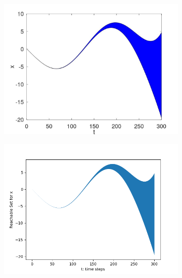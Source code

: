 \documentclass[EPiC]{easychair}
\begin{document}
\begin{figure}[h]
    \begin{subfigure}{0.47\textwidth}
    \centering
    \includegraphics[width=\textwidth]{SapoFigures/Rosslert/SapoRossler_X.jpg}
    \end{subfigure}
    \begin{subfigure}{0.47\textwidth}
    \centering
    \includegraphics[width=1.3\textwidth]{SapoFigures/Rosslert/KaaRosslerX.png}
    \end{subfigure}
  

\end{figure}
\end{document}
